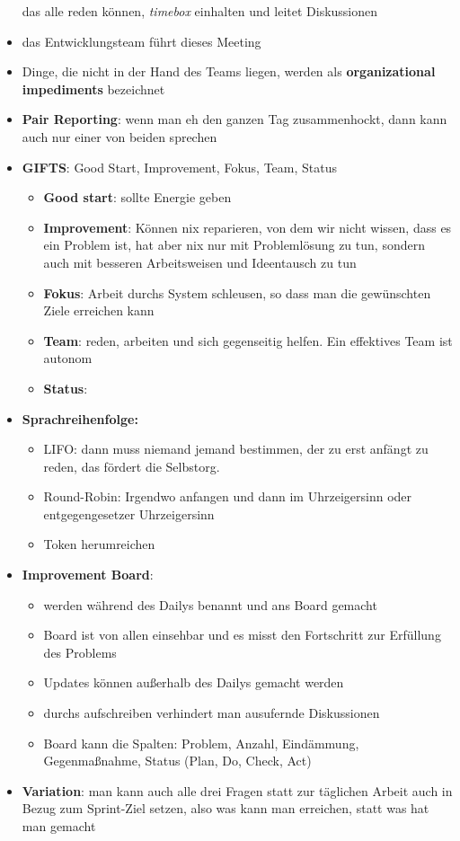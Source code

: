 \begin{Beschreibungfett}[Zusammenfassung]
\begin{itemize}
      das alle reden können, \textit{timebox} einhalten und leitet Diskussionen
    \item das Entwicklungsteam führt dieses Meeting
    \item Dinge, die nicht in der Hand des Teams liegen, werden als \textbf{organizational impediments} bezeichnet
    \item \textbf{Pair Reporting}: wenn man eh den ganzen Tag zusammenhockt, dann kann auch nur
      einer von beiden sprechen
    \item \textbf{GIFTS}: Good Start, Improvement, Fokus, Team, Status
      \begin{itemize}
        \item \textbf{Good start}: sollte Energie geben
        \item \textbf{Improvement}: Können nix reparieren, von dem wir nicht wissen, dass es ein
          Problem ist, hat aber nix nur mit Problemlösung zu tun, sondern auch mit besseren
          Arbeitsweisen und Ideentausch zu tun
        \item \textbf{Fokus}: Arbeit durchs System schleusen, so dass man die gewünschten Ziele
          erreichen kann
        \item \textbf{Team}: reden, arbeiten und sich gegenseitig helfen. Ein effektives Team ist
          autonom
        \item \textbf{Status}:
      \end{itemize}
    \item \textbf{Sprachreihenfolge:}
      \begin{itemize}
        \item LIFO: dann muss niemand jemand bestimmen, der zu erst anfängt zu reden, das
          fördert die Selbstorg.
        \item Round-Robin: Irgendwo anfangen und dann im Uhrzeigersinn oder
          entgegengesetzer Uhrzeigersinn
        \item Token herumreichen
      \end{itemize}
    \item \textbf{Improvement Board}:
      \begin{itemize}
        \item werden während des Dailys benannt und ans Board gemacht
        \item Board ist von allen einsehbar und es misst den Fortschritt zur Erfüllung des Problems
        \item Updates können außerhalb des Dailys gemacht werden
        \item durchs aufschreiben verhindert man ausufernde Diskussionen
        \item Board kann die Spalten: Problem, Anzahl, Eindämmung, Gegenmaßnahme, Status
          (Plan, Do, Check, Act)
      \end{itemize}
    \item \textbf{Variation}: man kann auch alle drei Fragen statt zur täglichen Arbeit auch in
      Bezug zum Sprint-Ziel setzen, also was kann man erreichen, statt was hat man gemacht
  \end{itemize}
\end{Beschreibungfett}


